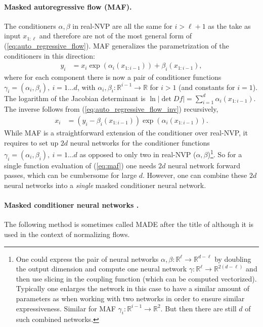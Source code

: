 \documentclass[12pt,a4paper]{article}
\begin{document}
\paragraph{Masked autoregressive flow (MAF)\cite{papamakarios_2017_maf}.}  The conditioners $\alpha, \beta$ in real-NVP are all the same for $i > \ell + 1$ as the take as input $x_{1:\ell}$ and therefore are not of the most general form of (\ref{eq:auto_regressive_flow}). MAF generalizes the parametrization of the conditioners in this direction:
\begin{align} \label{eq:real_nvp}
y_{i} &= x_i \exp(\alpha_i(x_{1:i-1})) + \beta_i(x_{1:i-1}),
\end{align}
where for each component there is now a pair of conditioner functions $\gamma_i=(\alpha_i, \beta_i), ~ i=1\dots d$, with  $\alpha_i, \beta_i: \mathbb{R}^{i-1} \rightarrow \mathbb{R}$ for $i>1$ (and  constants for $i=1$). The logarithm of the Jacobian determinant is $\ln |\det Df| = \sum_{i=1}^d\alpha_i(x_{1:i-1})$. The inverse follows from 
(\ref{eq:auto_regressive_flow_inv}) recursively, 
\begin{align} \label{eq:maf}
	x_{i} &= (y_i -  \beta_i(x_{1:i-1})) \exp(\alpha_i(x_{1:i-1})). 
\end{align}
While MAF is a straightforward extension of the conditioner over real-NVP, it requires to set up $2d$ neural networks for the conditioner functions  $\gamma_i = (\alpha_i, \beta_i), ~ i=1\dots d$ as opposed to only two in real-NVP ($\alpha, \beta$)\footnote{One could express the pair of neural networks $\alpha, \beta: \mathbb{R}^\ell \rightarrow \mathbb{R}^{d - \ell}$ by doubling the output dimension and compute one neural network $\gamma: \mathbb{R}^\ell \rightarrow \mathbb{R}^{2(d - \ell)}$ and then use slicing in the coupling function (which can be computed vectorized). Typically one enlarges the network in this case to have a similar amount of parameters as  when working with two networks in order to ensure similar expressiveness. Similar for MAF $\gamma_i: \mathbb{R}^{i-1} \rightarrow \mathbb{R}^{2}$. But then there are still $d$ of such combined networks.}. So for a single function evaluation of (\ref{eq:maf}) one needs $2d$ neural network forward passes, which can be cumbersome for large $d$.  However, one can combine these $2d$ neural networks into a  \textit{single} masked conditioner neural network.

\paragraph{Masked conditioner neural networks \cite{germain_2015_made}.} The following method is sometimes called MADE after the title of \cite{germain_2015_made} although it is used in the context of normalizing flows.
\end{document}
